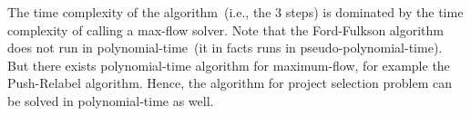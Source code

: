 The time complexity of the algorithm~(i.e., the 3 steps) is dominated by the time complexity
of calling a max-flow solver. Note that the Ford-Fulkson algorithm does not run in polynomial-time~(it in facts
runs in pseudo-polynomial-time). But there exists polynomial-time algorithm for maximum-flow, for example
the Push-Relabel algorithm. Hence, the algorithm for project selection problem can be solved in polynomial-time as well.
